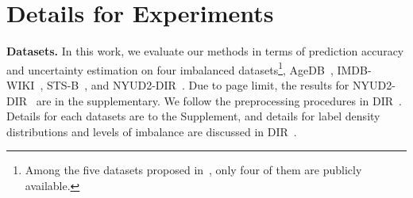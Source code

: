 \begin{table*}[h]
\setlength{\tabcolsep}{7.5pt}
\caption{\textbf{Comparison for different numbers of Bins.} "Med." is short for "Medium".}
\vspace{-1pt}
\label{table:bin-size}
\small
\begin{center}
\end{center}
\vspace{-0.3cm}
\end{table*} 
%

\section{Details for Experiments}
{\textbf{Datasets.} In this work, we evaluate our methods in terms of prediction accuracy and uncertainty estimation on four imbalanced datasets\footnote{Among the five datasets proposed in~\citep{DIR}, only four of them are publicly available.}, AgeDB~\citep{AGEDB}, IMDB-WIKI~\citep{IMDBWIKI}, STS-B~\citep{STS-B}, and NYUD2-DIR~\citep{NYUD2}. Due to page limit, the results for NYUD2-DIR~\citep{NYUD2} are in the supplementary. We follow the preprocessing procedures in DIR~\citep{DIR}. Details for each datasets are to the Supplement, and details for label density distributions and levels of imbalance are discussed in DIR~\citep{DIR}.}

